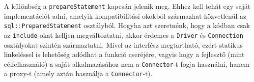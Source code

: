 A különbség a \texttt{prepareStatement} kapcsán jelenik meg. Ehhez kell tehát egy saját implementációt adni, amelyik kompatibilitási okokból származhat közvetlenül az \texttt{sql::PreparedStatement} osztályból. Hogyha azt szeretnénk, hogy a kódban csak az \texttt{include}-okat kelljen megváltoztatni, akkor érdemes a \texttt{Driver} és \texttt{Connection} osztályokat szintén származtatni. Mivel az interfész megtartható, ezért statikus linkeléssel is lehetőség adódhat a funkció cseréjére, vagyis hogy a fejlesztő (mint célfelhasználó) a saját alkalmazásához nem a \texttt{Connector}-t fogja használni, hanem a proxy-t (amely aztán használja a \texttt{Connector}-t).


